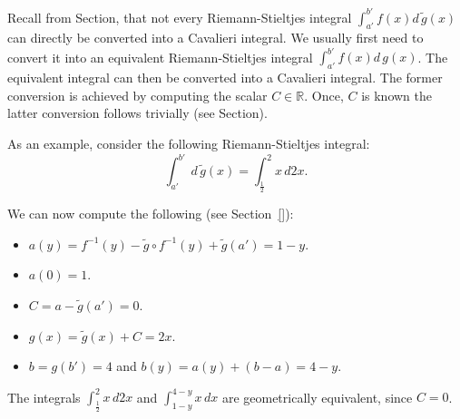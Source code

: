 \documentclass[twoside,reqno,11pt]{fcaa-var} %
\begin{document}
Recall from Section, that not every Riemann-Stieltjes integral $\int_{a'}^{b'} f(x) d\,\widetilde{g}(x)$ can directly be converted into a Cavalieri integral. We usually first need to convert it into an equivalent 
Riemann-Stieltjes integral $\int_{a'}^{b'} f(x) d\,g(x)$. The equivalent integral can then be converted into a Cavalieri integral. The former conversion is achieved by computing the scalar $C\in\mathbb{R}$. Once, $C$ is known the latter conversion follows trivially (see Section).

As an example, consider the following Riemann-Stieltjes integral:
\begin{equation}
\int_{a'}^{b'} \,d\,\widetilde{g}(x) = \int_{\frac{1}{2}}^2 x\,d2x.
\end{equation}

We can now compute the following (see Section~\ref{}):
\begin{itemize}
 \item $a(y) = f^{-1}(y) - \widetilde{g}\circ f^{-1}(y)+ \widetilde{g}(a') = 1-y$.
 \item $a(0) = 1$.
 \item $C = a - \widetilde{g}(a') = 0$.
 \item $g(x) = \widetilde{g}(x) + C = 2x$.
 \item $b = g(b') = 4$ and $b(y) = a(y) + (b-a) = 4-y$.
\end{itemize}
The integrals $\int_{\frac{1}{2}}^{2} x\,d2x$  and $\int_{1-y}^{4-y} x\,dx$ are geometrically equivalent, since $C=0$. 
\end{document}
